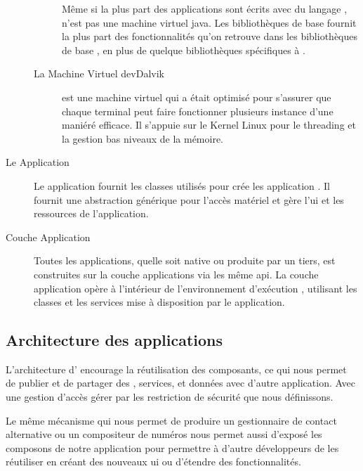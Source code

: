 \begin{description}
\begin{description}
Même si la plus part des applications \android{} sont écrits avec du langage
,  n'est pas une machine virtuel java. Les bibliothèques
\android{} de base fournit la plus part des fonctionnalités qu'on retrouve
dans les bibliothèques de base , en plus de quelque bibliothèques
spécifiques à \android{}.

\item [La Machine Virtuel dev{Dalvik}]

 est une machine virtuel qui a était optimisé pour s'assurer que
chaque terminal peut faire fonctionner plusieurs instance d'une maniéré
efficace. Il s’appuie sur le Kernel Linux pour le threading et la gestion bas
niveaux de la mémoire.

\end{description}

\item [Le \en{Framework} Application]

Le  application fournit les classes utilisés pour crée les application \android{}. Il fournit une abstraction générique pour l’accès matériel et gère l'\gls{ui} et les ressources de l'application.

\item [Couche Application]

Toutes les applications, quelle soit native ou produite par un tiers, est
construites sur la couche applications via les même \gls{api}. La couche
application opère à l'intérieur de l'environnement d’exécution \android{},
utilisant les classes et les services mise à disposition par le 
application.

\end{description}

\subsection[Architecture des applications \android{}]{Architecture des applications \android{}\cite{pa4ad:chptr1}}

L'architecture d'\android{} encourage la réutilisation des composants, ce qui nous permet de publier et de partager des , services, et données avec d'autre application. Avec une gestion d’accès gérer par les restriction de sécurité que nous définissons.

Le même mécanisme qui nous permet de produire un gestionnaire de contact alternative ou un compositeur de numéros nous permet aussi d'exposé les composons de notre application pour permettre à d'autre développeurs de les réutiliser en créant des nouveaux \gls{ui} ou d’étendre des fonctionnalités.

